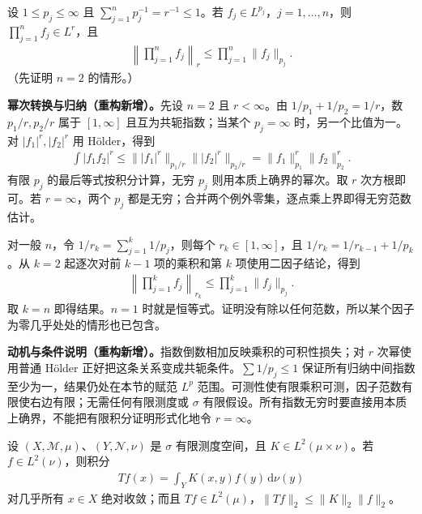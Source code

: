 \documentclass[../../main.tex]{subfiles}
\begin{document}
\begin{exercise}\label{exercise:ch06-generalized-holder}
设 $1\leqslant p_j\leqslant\infty$ 且 $\sum_{j=1}^n p_j^{-1}=r^{-1}\leqslant1$。若 $f_j\in L^{p_j}$，$j=1,\ldots,n$，则 $\prod_{j=1}^nf_j\in L^r$，且
\begin{align*}
\left\|\prod_{j=1}^nf_j\right\|_r\leqslant\prod_{j=1}^n\|f_j\|_{p_j}.
\end{align*}
（先证明 $n=2$ 的情形。）
\end{exercise}
\begin{solution}
\textbf{幂次转换与归纳（重构新增）。}先设 $n=2$ 且 $r<\infty$。由 $1/p_1+1/p_2=1/r$，数 $p_1/r,p_2/r$ 属于 $[1,\infty]$ 且互为共轭指数；当某个 $p_j=\infty$ 时，另一个比值为一。对 $|f_1|^r,|f_2|^r$ 用 Hölder，得到
\begin{align*}
\int|f_1f_2|^r\leqslant
\bigl\||f_1|^r\bigr\|_{p_1/r}\bigl\||f_2|^r\bigr\|_{p_2/r}
=\|f_1\|_{p_1}^r\|f_2\|_{p_2}^r.
\end{align*}
有限 $p_j$ 的最后等式按积分计算，无穷 $p_j$ 则用本质上确界的幂次。取 $r$ 次方根即可。若 $r=\infty$，两个 $p_j$ 都是无穷；合并两个例外零集，逐点乘上界即得无穷范数估计。

对一般 $n$，令 $1/r_k=\sum_{j=1}^k1/p_j$，则每个 $r_k\in[1,\infty]$，且 $1/r_k=1/r_{k-1}+1/p_k$。从 $k=2$ 起逐次对前 $k-1$ 项的乘积和第 $k$ 项使用二因子结论，得到
\begin{align*}
\left\|\prod_{j=1}^kf_j\right\|_{r_k}\leqslant\prod_{j=1}^k\|f_j\|_{p_j}.
\end{align*}
取 $k=n$ 即得结果。$n=1$ 时就是恒等式。证明没有除以任何范数，所以某个因子为零几乎处处的情形也已包含。
\end{solution}
\begin{remark}
\textbf{动机与条件说明（重构新增）。}指数倒数相加反映乘积的可积性损失；对 $r$ 次幂使用普通 Hölder 正好把这条关系变成共轭条件。$\sum1/p_j\leqslant1$ 保证所有归纳中间指数至少为一，结果仍处在本节的赋范 $L^p$ 范围。可测性使有限乘积可测，因子范数有限使右边有限；无需任何有限测度或 $\sigma$ 有限假设。所有指数无穷时要直接用本质上确界，不能把有限积分证明形式化地令 $r=\infty$。
\end{remark}
\begin{exercise}\label{exercise:ch06-square-integrable-kernel}
设 $(X,\mathscr M,\mu)$、$(Y,\mathscr N,\nu)$ 是 $\sigma$ 有限测度空间，且 $K\in L^2(\mu\times\nu)$。若 $f\in L^2(\nu)$，则积分
\begin{align*}
Tf(x)=\int_YK(x,y)f(y)\,\mathrm d\nu(y)
\end{align*}
对几乎所有 $x\in X$ 绝对收敛；而且 $Tf\in L^2(\mu)$，$\|Tf\|_2\leqslant\|K\|_2\|f\|_2$。
\end{exercise}
\end{document}
